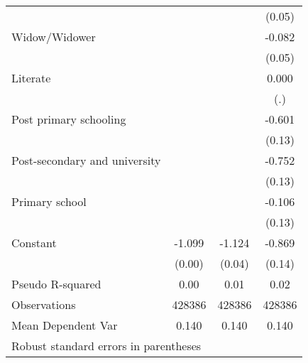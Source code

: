 {\begin{tabular}{l*{3}{c}}
                    &                     &                     &      (0.05)         \\
Widow/Widower       &                     &                     &      -0.082         \\
                    &                     &                     &      (0.05)         \\
Literate            &                     &                     &       0.000         \\
                    &                     &                     &         (.)         \\
Post primary schooling&                     &                     &      -0.601\sym{***}\\
                    &                     &                     &      (0.13)         \\
Post-secondary and university&                     &                     &      -0.752\sym{***}\\
                    &                     &                     &      (0.13)         \\
Primary school      &                     &                     &      -0.106         \\
                    &                     &                     &      (0.13)         \\
Constant            &      -1.099\sym{***}&      -1.124\sym{***}&      -0.869\sym{***}\\
                    &      (0.00)         &      (0.04)         &      (0.14)         \\
\hline
Pseudo R-squared    &        0.00         &        0.01         &        0.02         \\
Observations        &      428386         &      428386         &      428386         \\
Mean Dependent Var  &       0.140         &       0.140         &       0.140         \\
\hline\hline
\multicolumn{4}{l}{\footnotesize Robust standard errors in parentheses}\\
\end{tabular}
}
